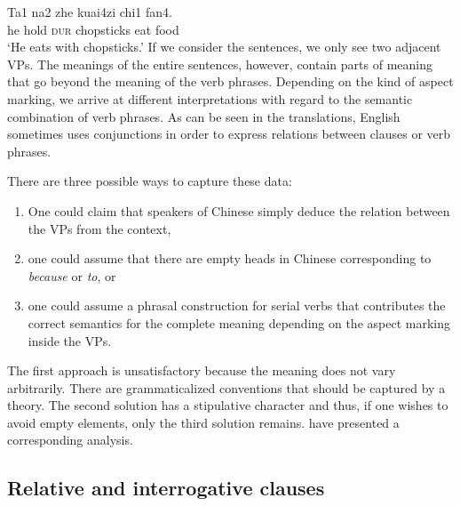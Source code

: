 \begin{exe}
\begin{xlist}[iv.]
\begin{exe}
\begin{xlist}[iv.]
\ex
\gll Ta1 na2 zhe kuai4zi chi1 fan4.\\
     he  hold \textsc{dur} chopsticks eat food \\
\glt `He eats with chopsticks.'
\zl
If we consider the sentences, we only see two adjacent VPs. The meanings of the entire sentences, however, contain parts of meaning that go beyond the meaning
of the verb phrases. Depending on the kind of aspect marking, we arrive at different interpretations with regard to the semantic combination of verb phrases.
As can be seen in the translations, English sometimes uses conjunctions in order to express relations between clauses or verb phrases.

There are three possible ways to capture these data:
\begin{enumerate}
\item One could claim that speakers of Chinese simply deduce the relation between the VPs from the context,
\item one could assume that there are empty heads in Chinese corresponding to \emph{because} or \emph{to}, or
\item one could assume a phrasal construction for serial verbs that contributes the correct semantics for the complete
meaning depending on the aspect marking inside the VPs.
\end{enumerate}
The first approach is unsatisfactory because the meaning does not vary arbitrarily. There are grammaticalized conventions that
should be captured by a theory. The second solution has a stipulative character and thus, if one wishes to avoid empty elements, only
the third solution remains. \citet{ML2009a} have presented a corresponding analysis.

\subsection{Relative and interrogative clauses}
\label{Abschnitt-Relativ-Interrogativsaetze}


\end{xlist}
\end{exe}
\end{xlist}
\end{exe}
